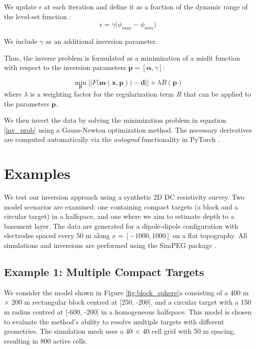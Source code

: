 \documentclass{segabs}
\begin{document}
We update $\epsilon$ at each iteration and define it as a fraction of the dynamic range of the level-set function \citep{kadu_salt_2017}:
\begin{equation}\label{trans_width}
\epsilon = \gamma\big(\phi_{max} - \phi_{min}\big)
\end{equation}

We include $\gamma$ as an additional inversion parameter.

Thus, the inverse problem is formulated as a minimization of a misfit function with respect to the inversion parameters $\mathbf{p} = [\boldsymbol{\alpha}, \gamma]$:

\begin{equation}\label{inv_prob}
\min_{\mathbf{p}} ||F\big(\mathbf{m(x,p)}\big) - \mathbf{d}|| + \lambda R({\mathbf{p}})
\end{equation}
where $\lambda$ is a weighting factor for the regularization term $R$ that can be applied to the parameters $\mathbf{p}$.

We then invert the data by solving the minimization problem in equation \eqref{inv_prob} using a Gauss-Newton optimization method. The necessary derivatives are computed automatically via the \textit{autograd} functionality in PyTorch \citep{ansel_pytorch_2024}.

\vspace{-0.45cm}
\section{Examples}
\vspace{-0.25cm}

We test our inversion approach using a synthetic 2D DC resistivity survey. Two model scenarios are examined: one containing compact targets (a block and a circular target) in a halfspace, and one where we aim to estimate depth to a basement layer. The data are generated for a dipole-dipole configuration with electrodes spaced every 50 m along $x = [-1000, 1000]$ on a flat topography. All simulations and inversions are performed using the SimPEG package \citep{heagy_framework_2017,cockett_simpeg_2015}.

\subsection{Example 1: Multiple Compact Targets}
\vspace{-0.4cm}

We consider the model shown in Figure \ref{fig:block_sphere}a consisting of a 400 m $\times$ 200 m rectangular block centred at [250, -200], and a circular target with a 150 m radius centred at [-600, -200] in a homogeneous halfspace. This model is chosen to evaluate the method's ability to resolve multiple targets with different geometries. The simulation mesh uses a 40 $\times$ 40 cell grid with 50 m spacing, resulting in 800 active cells.
\end{document}
